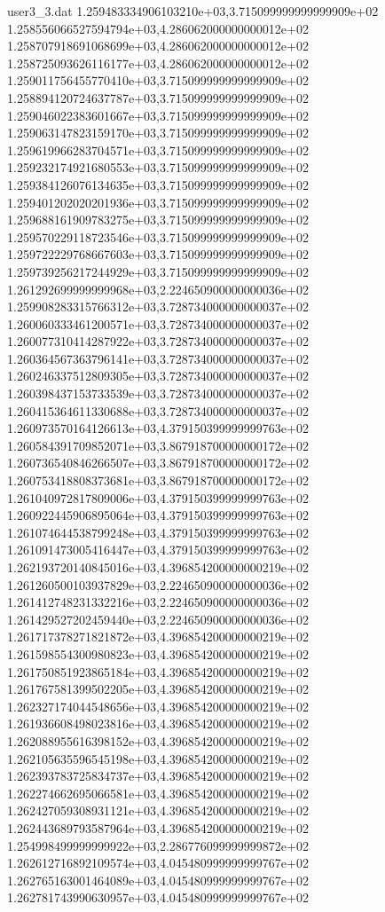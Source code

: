 \begin{filecontents}{user3_3.dat}
1.259483334906103210e+03,3.715099999999999909e+02
1.258556066527594794e+03,4.286062000000000012e+02
1.258707918691068699e+03,4.286062000000000012e+02
1.258725093626116177e+03,4.286062000000000012e+02
1.259011756455770410e+03,3.715099999999999909e+02
1.258894120724637787e+03,3.715099999999999909e+02
1.259046022383601667e+03,3.715099999999999909e+02
1.259063147823159170e+03,3.715099999999999909e+02
1.259619966283704571e+03,3.715099999999999909e+02
1.259232174921680553e+03,3.715099999999999909e+02
1.259384126076134635e+03,3.715099999999999909e+02
1.259401202020201936e+03,3.715099999999999909e+02
1.259688161909783275e+03,3.715099999999999909e+02
1.259570229118723546e+03,3.715099999999999909e+02
1.259722229768667603e+03,3.715099999999999909e+02
1.259739256217244929e+03,3.715099999999999909e+02
1.261292699999999968e+03,2.224650900000000036e+02
1.259908283315766312e+03,3.728734000000000037e+02
1.260060333461200571e+03,3.728734000000000037e+02
1.260077310414287922e+03,3.728734000000000037e+02
1.260364567363796141e+03,3.728734000000000037e+02
1.260246337512809305e+03,3.728734000000000037e+02
1.260398437153733539e+03,3.728734000000000037e+02
1.260415364611330688e+03,3.728734000000000037e+02
1.260973570164126613e+03,4.379150399999999763e+02
1.260584391709852071e+03,3.867918700000000172e+02
1.260736540846266507e+03,3.867918700000000172e+02
1.260753418808373681e+03,3.867918700000000172e+02
1.261040972817809006e+03,4.379150399999999763e+02
1.260922445906895064e+03,4.379150399999999763e+02
1.261074644538799248e+03,4.379150399999999763e+02
1.261091473005416447e+03,4.379150399999999763e+02
1.262193720140845016e+03,4.396854200000000219e+02
1.261260500103937829e+03,2.224650900000000036e+02
1.261412748231332216e+03,2.224650900000000036e+02
1.261429527202459440e+03,2.224650900000000036e+02
1.261717378271821872e+03,4.396854200000000219e+02
1.261598554300980823e+03,4.396854200000000219e+02
1.261750851923865184e+03,4.396854200000000219e+02
1.261767581399502205e+03,4.396854200000000219e+02
1.262327174044548656e+03,4.396854200000000219e+02
1.261936608498023816e+03,4.396854200000000219e+02
1.262088955616398152e+03,4.396854200000000219e+02
1.262105635596545198e+03,4.396854200000000219e+02
1.262393783725834737e+03,4.396854200000000219e+02
1.262274662695066581e+03,4.396854200000000219e+02
1.262427059308931121e+03,4.396854200000000219e+02
1.262443689793587964e+03,4.396854200000000219e+02
1.254998499999999922e+03,2.286776099999999872e+02
1.262612716892109574e+03,4.045480999999999767e+02
1.262765163001464089e+03,4.045480999999999767e+02
1.262781743990630957e+03,4.045480999999999767e+02

\end{filecontents}
